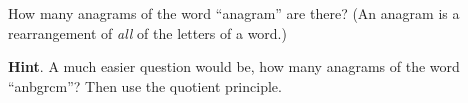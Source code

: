 \documentclass{book}
\begin{document}
\setcounter{cpjt}{115}
\addtocounter{cpjt}{-1}
\begin{activity}\label{activity-108}
\hypertarget{p-786}{}%
How many anagrams of the word ``anagram'' are there? (An anagram is a rearrangement of \emph{all} of the letters of a word.)%
\par\smallskip%
\noindent\textbf{Hint}.\hypertarget{hint-72}{}\quad%
\hypertarget{p-787}{}%
A much easier question would be, how many anagrams of the word ``anbgrcm''?  Then use the quotient principle.%
\end{activity}

\clearpage
\end{document}
